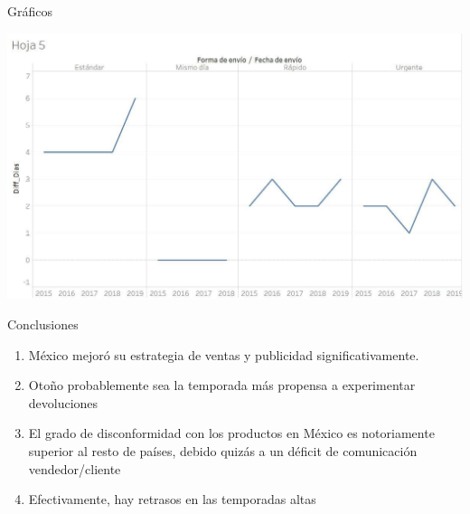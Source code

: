 \documentclass{beamer}
\begin{document}
\begin{frame}{Gráficos}

\begin{center}
\includegraphics[scale=0.5]{imagenes/Hipotesis4.jpg}  
\end{center}
	
\end{frame}	




\begin{frame}{Conclusiones}

\begin{enumerate}
	\item México mejoró su estrategia de ventas y publicidad significativamente.
	\item Otoño probablemente sea la temporada más propensa a experimentar devoluciones
	\item El grado de disconformidad con los productos en México es notoriamente superior al resto de países, debido quizás a un déficit de comunicación vendedor/cliente
	\item Efectivamente, hay retrasos en las temporadas altas
	\end{enumerate}
	
\end{frame}
	

%
%	
%	
\end{document}
